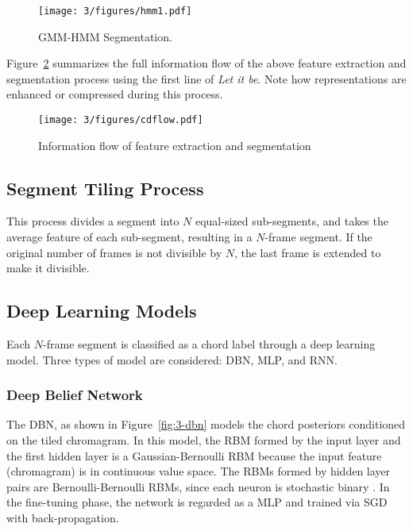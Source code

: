 \begin{figure}[htb]
\centering
\texttt{[image: 3/figures/hmm1.pdf]}
\caption{GMM-HMM Segmentation.}
\label{fig:3-hmm1}
\end{figure}

Figure~\ref{fig:3-cdflow} summarizes the full information flow of the above feature extraction and segmentation process using the first line of {\it Let it be}. Note how representations are enhanced or compressed during this process.
\begin{figure}[h]
\centering
\texttt{[image: 3/figures/cdflow.pdf]}
\caption{Information flow of feature extraction and segmentation}
\label{fig:3-cdflow}
\end{figure}

\subsection{Segment Tiling Process} \label{sec:3-seg-tile}

This process divides a segment into $N$ equal-sized sub-segments, and takes the average feature of each sub-segment, resulting in a $N$-frame segment. If the original number of frames is not divisible by $N$, the last frame is extended to make it divisible.

\subsection{Deep Learning Models} \label{sec:3-dlmodel}

Each $N$-frame segment is classified as a chord label through a deep learning model. Three types of model are considered: DBN, MLP, and RNN.

\subsubsection{Deep Belief Network}

The DBN, as shown in Figure~\ref{fig:3-dbn} models the chord posteriors conditioned on the tiled chromagram. In this model, the RBM formed by the input layer and the first hidden layer is a Gaussian-Bernoulli RBM because the input feature (chromagram) is in continuous value space. The RBMs formed by hidden layer pairs are Bernoulli-Bernoulli RBMs, since each neuron is stochastic binary \cite{hinton2006reducing}. In the fine-tuning phase, the network is regarded as a MLP and trained via SGD with back-propagation.

